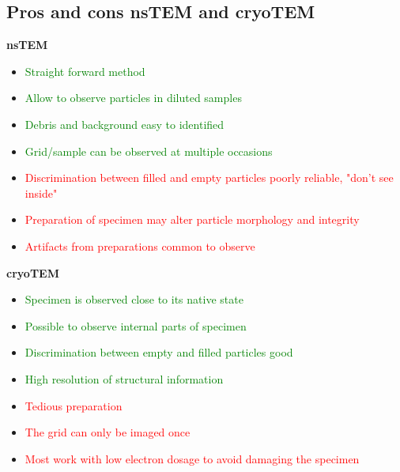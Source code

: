 	\subsection*{Pros and cons nsTEM and cryoTEM}
	\textbf{nsTEM}
	\begin{itemize}
		\item \textcolor{green}{Straight forward method}
		\item \textcolor{green}{Allow to observe particles in diluted samples} 
		\item \textcolor{green}{Debris and background easy to identified}
		\item \textcolor{green}{Grid/sample can be observed at multiple occasions}
		\item \textcolor{red}{Discrimination between filled and empty particles poorly reliable, "don't see inside"}
		\item \textcolor{red}{Preparation of specimen may alter particle morphology and integrity}
		\item \textcolor{red}{Artifacts from preparations common to observe}  
	\end{itemize}

	\textbf{cryoTEM}
	\begin{itemize}
		\item \textcolor{green}{Specimen is observed close to its native state}
		\item \textcolor{green}{Possible to observe internal parts of specimen}
		\item \textcolor{green}{Discrimination between empty and filled particles good}
		\item \textcolor{green}{High resolution of structural information}
		\item \textcolor{red}{Tedious preparation}
		\item \textcolor{red}{The grid can only be imaged once}
		\item \textcolor{red}{Most work with low electron dosage to avoid damaging the specimen}       
	\end{itemize}
	  
	
























	    


	      
